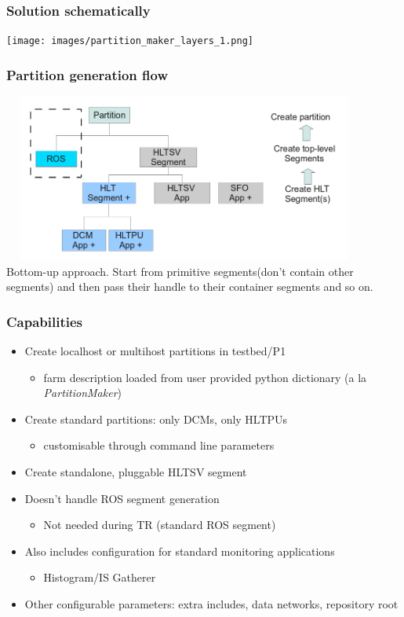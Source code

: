 \documentclass{beamer}
\begin{document}
\begin{frame}
 \frametitle{Solution schematically}
 \texttt{[image: images/partition\_maker\_layers\_1.png]}
 
\end{frame}


\begin{frame}
\frametitle{Partition generation flow}
\includegraphics[height=5.5cm,width=12cm]{images/generation_flow.png} \\
Bottom-up approach. Start from primitive segments(don't contain other segments) and then pass their handle to their container segments and so on.
\end{frame}


\begin{frame}
 \frametitle{Capabilities}
 \begin{itemize}
   \item Create localhost or multihost partitions in testbed/P1
     \begin{itemize}
       \item farm description loaded from user provided python dictionary (a la \textit{PartitionMaker})
     \end{itemize}
   \item Create standard partitions: only DCMs, only HLTPUs
     \begin{itemize}
       \item customisable through command line parameters
     \end{itemize}

   \item Create standalone, pluggable HLTSV segment
     
   \item Doesn't handle ROS segment generation
     \begin{itemize}
       \item Not needed during TR (standard ROS segment)
     \end{itemize}

   \item Also includes configuration for standard monitoring applications
   \begin{itemize}
     \item Histogram/IS Gatherer
   \end{itemize}
     
   \item Other configurable parameters: extra includes, data networks, repository root

 \end{itemize}
 
\end{frame}
\end{document}
